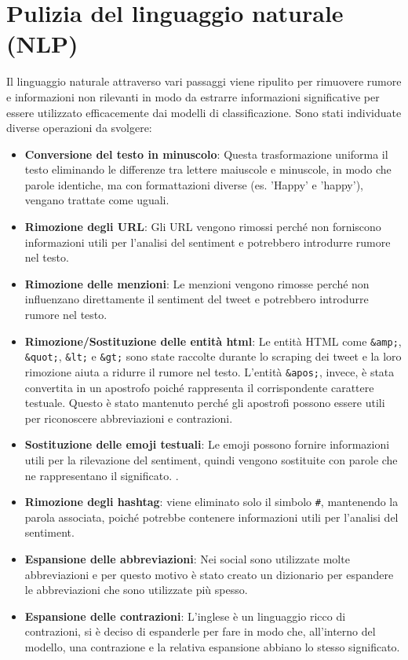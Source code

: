 \documentclass[12pt,a4paper]{report} %
\begin{document}
\section{Pulizia del linguaggio naturale (NLP)}
Il linguaggio naturale attraverso vari passaggi viene ripulito per rimuovere rumore e informazioni non rilevanti in modo da estrarre informazioni significative per essere utilizzato efficacemente dai modelli di classificazione.  Sono stati individuate diverse operazioni da svolgere:
\begin{itemize}
    \item \textbf{Conversione del testo in minuscolo}: Questa trasformazione uniforma il testo eliminando le differenze tra lettere maiuscole e minuscole, in modo che parole identiche, ma con formattazioni diverse (es. 'Happy' e 'happy'), vengano trattate come uguali.
    \item \textbf{Rimozione degli URL}: Gli URL vengono rimossi perché non forniscono informazioni utili per l'analisi del sentiment e potrebbero introdurre rumore nel testo.
    \item \textbf{Rimozione delle menzioni}: Le menzioni vengono rimosse perché non influenzano direttamente il sentiment del tweet e potrebbero introdurre rumore nel testo.
    \item \textbf{Rimozione/Sostituzione delle entità html}: Le entità HTML come \texttt{\&amp;}, \texttt{\&quot;}, \texttt{\&lt;} e \texttt{\&gt;} sono state raccolte durante lo scraping dei tweet e la loro rimozione aiuta a ridurre il rumore nel testo. L'entità \texttt{\&apos;}, invece, è stata convertita in un apostrofo poiché rappresenta il corrispondente carattere testuale. Questo è stato mantenuto perché gli apostrofi possono essere utili per riconoscere abbreviazioni e contrazioni.
    \item \textbf{Sostituzione delle emoji testuali}: Le emoji possono fornire informazioni utili per la rilevazione del sentiment, quindi vengono sostituite con parole che ne rappresentano il significato. .
    \item \textbf{Rimozione degli hashtag}: viene eliminato solo il simbolo \verb|#|, mantenendo la parola associata, poiché potrebbe contenere informazioni utili per l'analisi del sentiment. 
    \item  \textbf{Espansione delle abbreviazioni}: Nei social sono utilizzate molte abbreviazioni e per questo motivo è stato creato un dizionario per espandere le abbreviazioni che sono utilizzate più spesso.
    \item \textbf{Espansione delle contrazioni}: L'inglese è un linguaggio ricco di contrazioni, si è deciso di espanderle per fare in modo che, all'interno del modello, una contrazione e la relativa espansione abbiano lo stesso significato.

\end{itemize}
\end{document}

